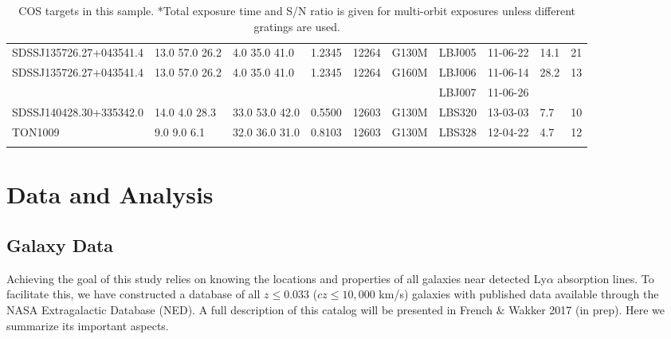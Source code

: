 \documentclass[iop]{emulateapj-rtx4}
\begin{document}
\begin{table}[ht]
\begin{center}
\begin{tabular}{l l l l l l l l l l}
SDSSJ135726.27+043541.4 & 13.0  57.0  26.2 &    4.0  35.0  41.0  &    1.2345  & 12264      &   G130M  &   LBJ005  		& 11-06-22		   & 14.1  &      21         \\
SDSSJ135726.27+043541.4 & 13.0  57.0  26.2 &    4.0  35.0  41.0  &    1.2345  & 12264      &   G160M  &   LBJ006  		& 11-06-14		   & 28.2  &      13         \\
				        	     & 	  	  	        &    		  	       &    	  	 & 	  	    &                &   LBJ007  			& 11-06-26		   &          &                   \\
SDSSJ140428.30+335342.0 & 14.0  4.0  28.3  &   33.0  53.0  42.0  &    0.5500  & 12603  	    &   G130M  &  LBS320   		& 13-03-03   		   &   7.7  &      10          \\
TON1009  			    &    9.0  9.0  6.1   &    32.0  36.0  31.0  &    0.8103  & 12603  	    &   G130M  &  LBS328   		& 12-04-22   		   &   4.7  &      12         \\

 \\
\hline

\end{tabular}
\end{center}
  \caption{\small{COS targets in this sample. *Total exposure time and S/N ratio is given for multi-orbit exposures unless different gratings are used.}}
  \label{target_table}
\end{table}


\section{Data and Analysis}

\subsection{Galaxy Data}

Achieving the goal of this study relies on knowing the locations and properties of all galaxies near detected Ly$\alpha$ absorption lines. To facilitate this, we have constructed a database of all $z\leq 0.033$ ($cz\leq 10,000$ km/s) galaxies with published data available through the NASA Extragalactic Database (NED). A full description of this catalog will be presented in French $\&$ Wakker 2017 (in prep). Here we summarize its important aspects. 
\end{document}
